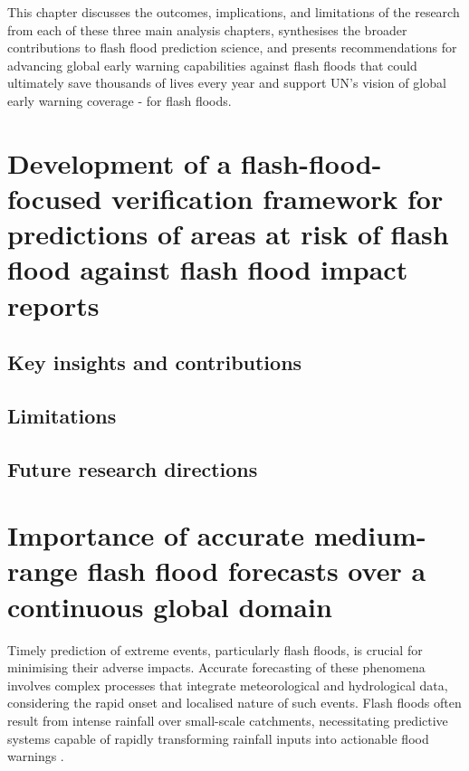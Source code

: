 This chapter discusses the outcomes, implications, and limitations of the research from each of these three main analysis chapters, synthesises the broader contributions to flash flood prediction science, and presents recommendations for advancing global early warning capabilities against flash floods that could ultimately save thousands of lives every year and support UN's vision of global early warning coverage - for flash floods.




\section{Development of a flash-flood-focused verification framework for predictions of areas at risk of flash flood against flash flood impact reports}

\subsection{Key insights and contributions}

\subsection{Limitations}

\subsection{Future research directions}

























\section{Importance of accurate medium-range flash flood forecasts over a continuous global domain}

Timely prediction of extreme events, particularly flash floods, is crucial for minimising their adverse impacts. Accurate forecasting of these phenomena involves complex processes that integrate meteorological and hydrological data, considering the rapid onset and localised nature of such events. Flash floods often result from intense rainfall over small-scale catchments, necessitating predictive systems capable of rapidly transforming rainfall inputs into actionable flood warnings \citep{Kim2011}.


